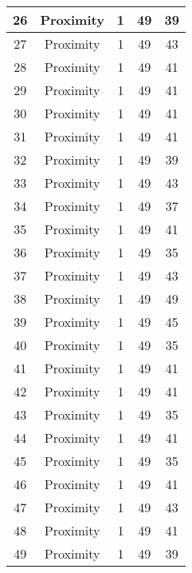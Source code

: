 \documentclass[results.tex]{subfiles}
\begin{document}
\begin{center}
\begin{tabular}{| c || c | c | c | c |}
    \hline
    26 & Proximity & 1 & 49 & 39 \\ 
    \hline
    27 & Proximity & 1 & 49 & 43 \\ 
    \hline
    28 & Proximity & 1 & 49 & 41 \\ 
    \hline
    29 & Proximity & 1 & 49 & 41 \\ 
    \hline
    30 & Proximity & 1 & 49 & 41 \\ 
    \hline
    31 & Proximity & 1 & 49 & 41 \\ 
    \hline
    32 & Proximity & 1 & 49 & 39 \\ 
    \hline
    33 & Proximity & 1 & 49 & 43 \\ 
    \hline
    34 & Proximity & 1 & 49 & 37 \\ 
    \hline
    35 & Proximity & 1 & 49 & 41 \\ 
    \hline
    36 & Proximity & 1 & 49 & 35 \\ 
    \hline
    37 & Proximity & 1 & 49 & 43 \\ 
    \hline
    38 & Proximity & 1 & 49 & 49 \\ 
    \hline
    39 & Proximity & 1 & 49 & 45 \\ 
    \hline
    40 & Proximity & 1 & 49 & 35 \\ 
    \hline
    41 & Proximity & 1 & 49 & 41 \\ 
    \hline
    42 & Proximity & 1 & 49 & 41 \\ 
    \hline
    43 & Proximity & 1 & 49 & 35 \\ 
    \hline
    44 & Proximity & 1 & 49 & 41 \\ 
    \hline
    45 & Proximity & 1 & 49 & 35 \\ 
    \hline
    46 & Proximity & 1 & 49 & 41 \\ 
    \hline
    47 & Proximity & 1 & 49 & 43 \\ 
    \hline
    48 & Proximity & 1 & 49 & 41 \\ 
    \hline
    49 & Proximity & 1 & 49 & 39 \\ 
    \hline   \end{tabular}
\end{center}
\end{document}

